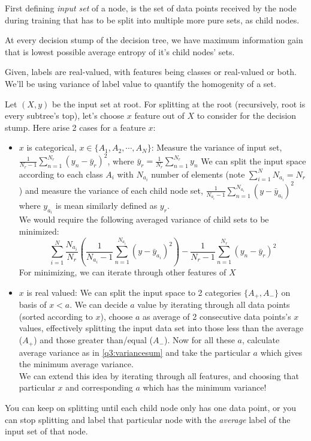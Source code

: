 \documentclass[a4paper,11pt]{article}
\begin{document}
\begin{mlsolution}

First defining \textit{input set} of a node, is the set of data points received by the node during training that has to be split into multiple more pure sets, as child nodes.

At every decision stump of the decision tree, we have maximum information gain that is lowest possible average entropy of it's child nodes' sets.

Given, labels are real-valued, with features being classes or real-valued or both. We'll be using variance of label value to quantify the homogenity of a set.

Let $(X, y)$ be the input set at root. For splitting at the root (recursively, root is every subtree's top), let's choose $x$ feature out of $X$ to consider for the decision stump. Here arise 2 cases for a feature $x$:
\begin{itemize}
    \item $x$ is categorical, $x \in \{A_1, A_2, \cdots, A_N\}$: Measure the variance of input set, $\frac{1}{N_r - 1}\sum_{n=1}^{N_r} (y_n - \bar{y}_r)^2$, where $\bar{y}_r = \frac{1}{N_r}\sum_{n=1}^{N_r}y_n$ We can split the input space according to each class $A_i$ with $N_{a_i}$ number of elements (note $\sum_{i=1}^{N}N_{a_i} = N_r$) and measure the variance of each child node set, $\frac{1}{N_{a_i} - 1}\sum_{n=1}^{N_{a_i}} (y - \bar{y}_{a_i})^2$ where $y_{a_i}$ is mean similarly defined as $y_r$. \\
    We would require the following averaged variance of child sets to be minimized:
    \begin{equation} \label{q3:variancesum}
    \sum_{i=1}^{N} \frac{N_{a_i}}{N_r} \left(\frac{1}{N_{a_i} - 1} \sum_{n=1}^{N_{a_i}} (y - \bar{y}_{a_i})^2\right) - \frac{1}{N_r - 1}\sum_{n=1}^{N_r} (y_n - \bar{y}_r)^2
    \end{equation}
    For minimizing, we can iterate through other features of $X$
    \item $x$ is real valued: We can split the input space to 2 categories $\{A_+, A_-\}$ on basis of $x < a$. We can decide $a$ value by iterating through all data points (sorted according to $x$), choose $a$ as average of 2 consecutive data points's $x$ values, effectively splitting the input data set into those less than the average ($A_+$) and those greater than/equal ($A_-$). Now for all these $a$, calculate average variance as in \ref{q3:variancesum} and take the particular $a$ which gives the minimum average variance. \\
    We can extend this idea by iterating through all features, and choosing that particular $x$ and corresponding $a$ which has the minimum variance!
\end{itemize}

You can keep on splitting until each child node only has one data point, or you can stop splitting and label that particular node with the \textit{average} label of the input set of that node.

\end{mlsolution}
\end{document}
